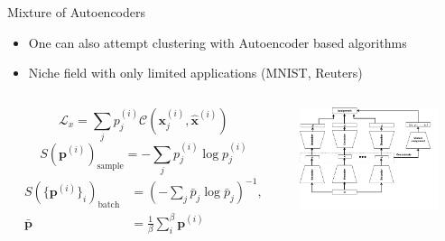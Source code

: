 \documentclass{beamer}
\begin{document}
\begin{frame}[t]{Mixture of Autoencoders}
	\begin{itemize}
		\item One can also attempt clustering with Autoencoder based algorithms
		\item Niche field with only limited applications (MNIST, Reuters)
	\end{itemize}
	\begin{columns}
		\begin{column}{0.6\textwidth}
\begin{equation*}\label{eq:mixae_reconst}
\mathcal{L}_x = \sum_j p_j^{(i)} \mathcal{C}(\boldsymbol{x}_j^{(i)}, \hat{\boldsymbol{x}}^{(i)})
\end{equation*}
\begin{equation*}\label{eq:mixae_sample}
S(\boldsymbol{p}^{(i)})_{\text{sample}} = -\sum_j p_j^{(i)} \log p_j^{(i)}
\end{equation*}
\begin{equation*}\label{eq:mixae_batch}
\begin{split}
S(\{\boldsymbol{p}^{(i)}\}_i)_{\text{batch}}&= \left(-\sum_j \bar{p}_j \log \bar{p}_j \right)^{-1},\\
\bar{\boldsymbol{p}} &= \frac{1}{\beta} \sum_i ^\beta \boldsymbol{p}^{(i)}
\end{split}
\end{equation*}
		\end{column}
		\begin{column}{0.4\textwidth}
			\includegraphics[height=3cm]{../chapters/theory/autoencoder/plots/mixae.pdf}
		\end{column}
	\end{columns}
\end{frame}
\end{document}
